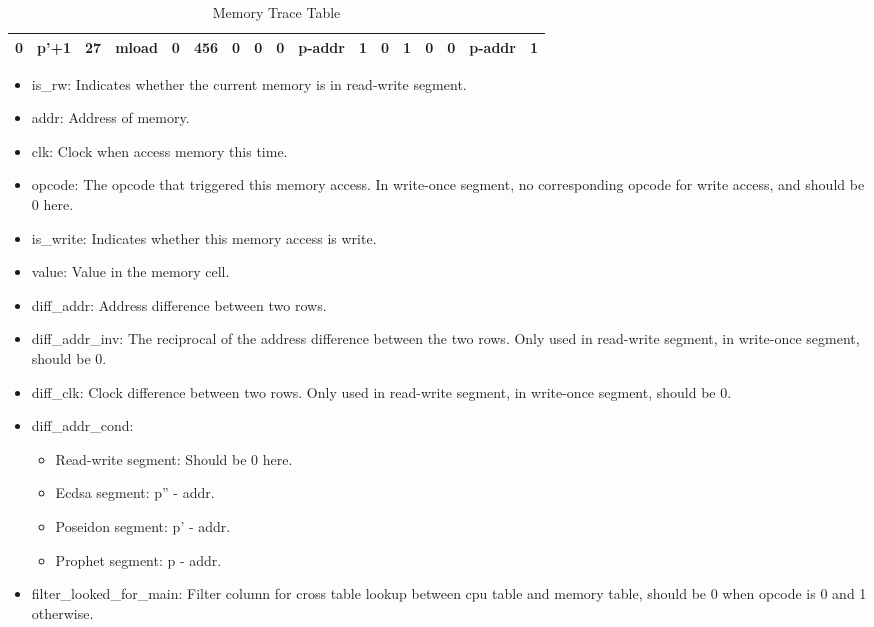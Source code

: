 \begin{table}[!ht]
\begin{adjustwidth}{-1.75cm}{}
\begin{tabular}{|c|c|c|c|c|c|c|c|c|c|c|c|c|c|c|c|c|}
            \hline
            \rowcolor{yellow!20} 0     & p'+1   & 27    & mload  & 0         & 456   & \cellcolor{lightgray} 0        & \cellcolor{lightgray} 0     & \cellcolor{lightgray} 0     & p-addr                  & \cellcolor{violet!30} 1     & 0     & \cellcolor{pink} 1     & \cellcolor{pink} 0     & \cellcolor{pink} 0     & p-addr   & 1     \\
            \hline
        \end{tabular}
        \caption{Memory Trace Table}
        \label{table:memory-trace-table}
    \end{adjustwidth}
\end{table}

\begin{itemize}
    \item is\_rw: Indicates whether the current memory is in read-write segment.
    \item addr: Address of memory.
    \item clk: Clock when access memory this time.
    \item opcode: The opcode that triggered this memory access. In write-once segment, no corresponding opcode for write access, and should be 0 here.
    \item is\_write: Indicates whether this memory access is write.
    \item value: Value in the memory cell.
    \item diff\_addr: Address difference between two rows.
    \item diff\_addr\_inv: The reciprocal of the address difference between the two rows. Only used in read-write segment, in write-once segment, should be 0.
    \item diff\_clk: Clock difference between two rows. Only used in read-write segment, in write-once segment, should be 0.
    \item diff\_addr\_cond:
          \begin{itemize}
              \item Read-write segment: Should be 0 here.
              \item Ecdsa segment: p'' - addr.
              \item Poseidon segment: p' - addr.
              \item Prophet segment: p - addr.
          \end{itemize}
    \item filter\_looked\_for\_main: Filter column for cross table lookup between cpu table and memory table, should be 0 when opcode is 0 and 1 otherwise.

\end{itemize}
